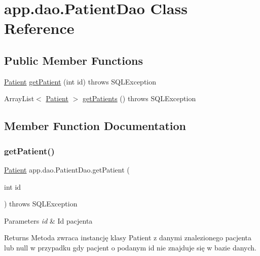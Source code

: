 \hypertarget{classapp_1_1dao_1_1_patient_dao}{}\section{app.\+dao.\+Patient\+Dao Class Reference}
\label{classapp_1_1dao_1_1_patient_dao}
\subsection*{Public Member Functions}
\begin{DoxyCompactItemize}
\item 
\mbox{\hyperlink{classapp_1_1entity_1_1_patient}{Patient}} \mbox{\hyperlink{classapp_1_1dao_1_1_patient_dao_a40b301232820084e66abe4e3de61784e}{get\+Patient}} (int id)  throws S\+Q\+L\+Exception 
\item 
Array\+List$<$ \mbox{\hyperlink{classapp_1_1entity_1_1_patient}{Patient}} $>$ \mbox{\hyperlink{classapp_1_1dao_1_1_patient_dao_ad5669e99f35b72e402e3ef014b3ae112}{get\+Patients}} ()  throws S\+Q\+L\+Exception 
\end{DoxyCompactItemize}


\subsection{Member Function Documentation}
\mbox{\label{classapp_1_1dao_1_1_patient_dao_a40b301232820084e66abe4e3de61784e}} 
\subsubsection{\texorpdfstring{getPatient()}{getPatient()}}
{\footnotesize\ttfamily \mbox{\hyperlink{classapp_1_1entity_1_1_patient}{Patient}} app.\+dao.\+Patient\+Dao.\+get\+Patient (\begin{DoxyParamCaption}\item[{int}]{id }\end{DoxyParamCaption}) throws S\+Q\+L\+Exception}


\begin{DoxyParams}{Parameters}
{\em id} & Id pacjenta \\
\hline
\end{DoxyParams}
\begin{DoxyReturn}{Returns}
Metoda zwraca instancję klasy Patient z danymi znalezionego pacjenta lub null w przypadku gdy pacjent o podanym id nie znajduje się w bazie danych. 
\end{DoxyReturn}

